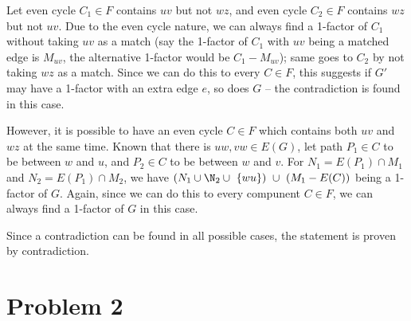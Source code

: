 \documentclass[11pt]{article}
\begin{document}
Let even cycle $C_1 \in F$ contains $uv$ but not $wz$, and even cycle $C_2 \in F$ contains $wz$ but not $uv$. Due to the even cycle nature, we can always find a 1-factor of $C_1$ without taking $uv$ as a match (say the 1-factor of $C_1$ with $uv$ being a matched edge is $M_{uv}$, the alternative 1-factor would be $C_1 - M_{uv}$); same goes to $C_2$ by not taking $wz$ as a match. Since we can do this to every $C \in F$, this suggests if $G'$ may have a 1-factor with an extra edge $e$, so does $G$ -- the contradiction is found in this case.

However, it is possible to have an even cycle $C \in F$ which contains both $uv$ and $wz$ at the same time. Known that there is $uw, vw \in E(G)$, let path $P_1 \in C$ to be between $w$ and $u$, and $P_2 \in C$ to be between $w$ and $v$. For $N_1 = E(P_1) \cap M_1$ and $N_2 = E(P_1) \cap M_2$, we have $(N_1 \cup \N_2 \cup \ \{wu\})  \ \cup \ (M_1 - E(C))$ being a 1-factor of $G$. Again, since we can do this to every compunent $C \in F$, we can always find a 1-factor of $G$ in this case.\newline

Since a contradiction can be found in all possible cases, the statement is proven by contradiction.








\section{Problem 2}

%
% 
% 
\end{document}
